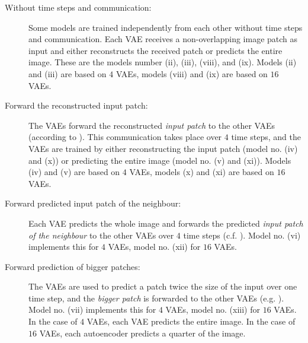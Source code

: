 \begin{description}
	\item [Without time steps and communication:] Some models are trained independently from each other without time steps and communication. Each VAE receives a non-overlapping image patch as input and either reconstructs the received patch or predicts the entire image. These are the models number (ii), (iii), (viii), and (ix). Models (ii) and (iii) are based on $4$ VAEs, models (viii) and (ix) are based on $16$ VAEs.
	\item [Forward the reconstructed input patch:] The VAEs forward the reconstructed \emph{input patch} to the other VAEs (according to ). This communication takes place over $4$ time steps, and the VAEs are trained by either reconstructing the input patch (model no. (iv) and (x)) or predicting the entire image (model no. (v) and (xi)). Models (iv) and (v) are based on $4$ VAEs, models (x) and (xi) are based on $16$ VAEs.
	\item [Forward predicted input patch of the neighbour:] Each VAE predicts the whole image and forwards the predicted \emph{input patch of the neighbour} to the other VAEs over $4$ time steps (c.f. ). Model no. (vi) implements this for $4$ VAEs, model no. (xii) for $16$ VAEs.
	\item [Forward prediction of bigger patches:] The VAEs are used to predict a patch twice the size of the input over one time step, and the \emph{bigger patch} is forwarded to the other VAEs (e.g. ). Model no. (vii) implements this for $4$ VAEs, model no. (xiii) for $16$ VAEs. In the case of $4$ VAEs, each VAE predicts the entire image. In the case of $16$ VAEs, each autoencoder predicts a quarter of the image.
\end{description}

